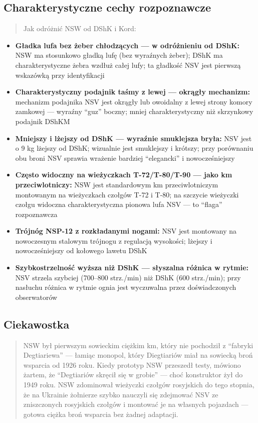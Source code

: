 \documentclass[12pt,oneside]{book}
\providecommand{\tightlist}{%
  \setlength{\itemsep}{0pt}\setlength{\parskip}{0pt}}
\begin{document}
\subsection{Charakterystyczne cechy
rozpoznawcze}\label{charakterystyczne-cechy-rozpoznawcze-74}

\begin{quote}
Jak odróżnić NSW od DShK i Kord:
\end{quote}

\begin{itemize}
\tightlist
\item
  \textbf{Gładka lufa bez żeber chłodzących --- w odróżnieniu od DShK:}
  NSW ma stosunkowo gładką lufę (bez wyraźnych żeber); DShK ma
  charakterystyczne żebra wzdłuż całej lufy; ta gładkość NSV jest
  pierwszą wskazówką przy identyfikacji
\item
  \textbf{Charakterystyczny podajnik taśmy z lewej --- okrągły
  mechanizm:} mechanizm podajnika NSV jest okrągły lub owoidalny z lewej
  strony komory zamkowej --- wyraźny ``guz'' boczny; mniej
  charakterystyczny niż skrzynkowy podajnik DShKM
\item
  \textbf{Mniejszy i lżejszy od DShK --- wyraźnie smuklejsza bryła:} NSV
  jest o 9 kg lżejszy od DShK; wizualnie jest smuklejszy i krótszy; przy
  porównaniu obu broni NSV sprawia wrażenie bardziej ``elegancki'' i
  nowocześniejszy
\item
  \textbf{Często widoczny na wieżyczkach T-72/T-80/T-90 --- jako km
  przeciwlotniczy:} NSW jest standardowym km przeciwlotniczym montowanym
  na wieżyczkach czołgów T-72 i T-80; na szczycie wieżyczki czołgu
  widoczna charakterystyczna pionowa lufa NSV --- to ``flaga''
  rozpoznawcza
\item
  \textbf{Trójnóg NSP-12 z rozkładanymi nogami:} NSV jest montowany na
  nowoczesnym stalowym trójnogu z regulacją wysokości; lżejszy i
  nowocześniejszy od kołowego lawetu DShK
\item
  \textbf{Szybkostrzelność wyższa niż DShK --- słyszalna różnica w
  rytmie:} NSV strzela szybciej (700--800 strz./min) niż DShK (600
  strz./min); przy nasłuchu różnica w rytmie ognia jest wyczuwalna przez
  doświadczonych obserwatorów
\end{itemize}

\subsection{Ciekawostka}\label{ciekawostka-74}

\begin{quote}
NSW był pierwszym sowieckim ciężkim km, który nie pochodził z ``fabryki
Degtiariewa'' --- łamiąc monopol, który Diegtiariów miał na sowiecką
broń wsparcia od 1926 roku. Kiedy prototyp NSW przeszedł testy, mówiono
żartem, że ``Degtiariów skręcił się w grobie'' --- choć konstruktor żył
do 1949 roku. NSW zdominował wieżyczki czołgów rosyjskich do tego
stopnia, że na Ukrainie żołnierze szybko nauczyli się zdejmować NSV ze
zniszczonych rosyjskich czołgów i montować je na własnych pojazdach ---
gotowa ciężka broń wsparcia bez żadnej adaptacji.
\end{quote}
\end{document}
